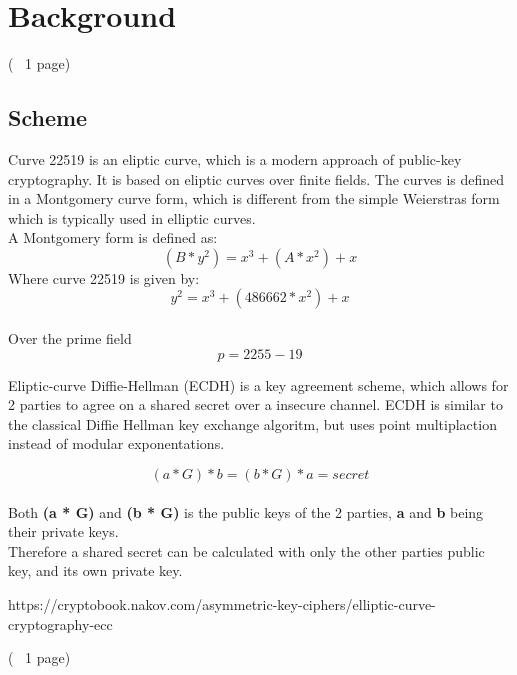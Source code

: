 \section{Background}

(~ 1 page)
\subsection{Scheme}
Curve 22519 is an eliptic curve, which is a modern approach of public-key cryptography. It is based on eliptic curves over finite fields.
The curves is defined in a Montgomery curve form, which is different from the simple Weierstras form which is typically used in elliptic curves.\\
A Montgomery form is defined as:\\
\[(B * y^2) = x^3 + (A * x^2) + x\]
Where curve 22519 is given by:\\
\[y^2 = x^3 + (486662 * x^2) + x\]\\
Over the prime field 
\[p = 2255 - 19\]

Eliptic-curve Diffie-Hellman (ECDH) is a key agreement scheme, which allows for 2 parties to agree on a shared secret over a insecure channel.
ECDH is similar to the classical Diffie Hellman key exchange algoritm, but uses point multiplaction instead of modular exponentations.

\[(a * G) * b = (b * G) * a = secret\]\\

Both \textbf{(a * G)} and \textbf{(b * G)} is the public keys of the 2 parties, \textbf{a} and \textbf{b} being their private keys.\\
Therefore a shared secret can be calculated with only the other parties public key, and its own private key.



https://cryptobook.nakov.com/asymmetric-key-ciphers/elliptic-curve-cryptography-ecc
\pagebreak

(~ 1 page)
